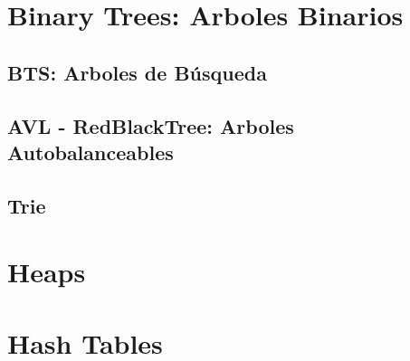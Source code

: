 \documentclass[12pt, fleqn]{report}                             %
\theoremstyle{break}                                            %
\begin{document}
    \chapter{Binary Trees: Arboles Binarios}

        \section{BTS: Arboles de Búsqueda}

        \section{AVL - RedBlackTree: Arboles Autobalanceables}

        \section{Trie}

    \clearpage
    \chapter{Heaps}


    \clearpage
    \chapter{Hash Tables}


\end{document}
